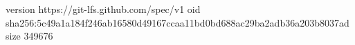 version https://git-lfs.github.com/spec/v1
oid sha256:5c49a1a184f246ab16580d49167ccaa11bd0bd688ac29ba2adb36a203b8037ad
size 349676
